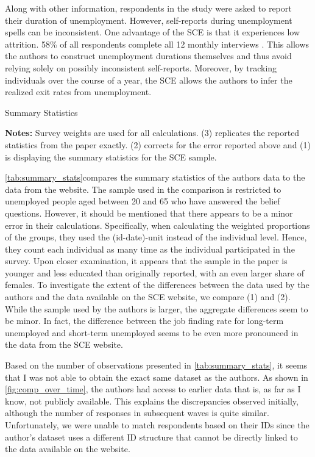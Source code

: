 \documentclass[11pt,a4paper,leqno]{article}
\begin{document}
Along with other information, respondents in the study were asked to report their duration of unemployment. However, self-reports during unemployment spells can be inconsistent.
 One advantage of the SCE is that it experiences low attrition. 58\% of all respondents complete all 12 monthly interviews \parencite{SCEOverview}. This allows the authors to construct unemployment durations themselves and thus avoid relying solely on possibly inconsistent self-reports.  Moreover, by tracking individuals over the course of a year, the SCE allows the authors to infer the realized exit rates from unemployment. 
 
     \begin{table}[!htbp] 
 	\centering 
 	\caption{Summary Statistics} 
 	\label{tab:summary_stats} 
 	
 	\begin{minipage}[center]{0.7\textwidth}
 		\caption*{\footnotesize \textbf{Notes:} Survey weights are used for all calculations. (3) replicates the reported statistics from the paper exactly. (2) corrects for the error reported above and (1) is displaying the summary statistics for the SCE sample.}
 	\end{minipage}
 \end{table}
 
 \autoref{tab:summary_stats}compares the summary statistics of the authors data to the data from the website. The sample used in the comparison is restricted to unemployed people aged between 20 and 65 who have answered the belief questions. However, it should be mentioned that there appears to be a minor error in their calculations. Specifically, when calculating the weighted proportions of the groups, they used the (id-date)-unit instead of the individual level. Hence, they count each individual as many time as the individual participated in the survey. Upon closer examination, it appears that the sample in the paper is younger and less educated than originally reported, with an even larger share of females. To investigate the extent of the differences between the data used by the authors and the data available on the SCE website, we compare (1) and (2). While the sample used by the authors is larger, the aggregate differences seem to be minor. In fact, the difference between the job finding rate for long-term unemployed and short-term unemployed seems to be even more pronounced in the data from the SCE website.  

Based on the number of observations presented in \autoref{tab:summary_stats}, it seems that I was not able to obtain the exact same dataset as the authors. As shown in \autoref{fig:comp_over_time}, the authors had access to earlier data that is, as far as I know, not publicly available. This explains the discrepancies observed initially, although the number of responses in subsequent waves is quite similar. Unfortunately, we were unable to match respondents based on their IDs since the author's dataset uses a different ID structure that cannot be directly linked to the data available on the website.
\end{document}
